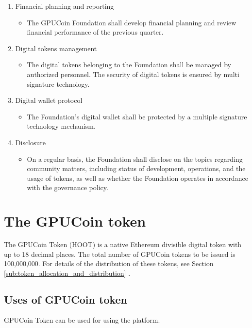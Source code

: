 \documentclass{article}
\begin{document}
\begin{enumerate}
 \item Financial planning and reporting
 \begin{itemize}
 \item The GPUCoin Foundation shall develop financial planning and review financial performance of the previous quarter.
 \end{itemize}

 \item Digital tokens management
 \begin{itemize}
 \item The digital tokens belonging to the Foundation shall be managed by authorized personnel. The security of digital tokens is ensured by multi signature technology.
 \end{itemize}

 \item Digital wallet protocol
 \begin{itemize}
 \item The Foundation’s digital wallet shall be protected by a multiple signature technology mechanism.
 \end{itemize}

 \item Disclosure
 \begin{itemize}
 \item On a regular basis, the Foundation shall disclose on the topics regarding community matters, including status of development, operations, and the usage of tokens, as well as whether the Foundation operates in accordance with the governance policy.
 \end{itemize}
\end{enumerate}


\section{The GPUCoin token}
The GPUCoin Token (HOOT) is a native Ethereum divisible digital token with up to 18 decimal places. The total number of GPUCoin tokens to be issued is 100,000,000. For details of the distribution of these tokens, see Section \ref{sub:token_allocation_and_distribution} .

\subsection{Uses of GPUCoin token} %
\label{sub:uses_of_hoot_token}
GPUCoin Token can be used for using the platform.

\end{document}

